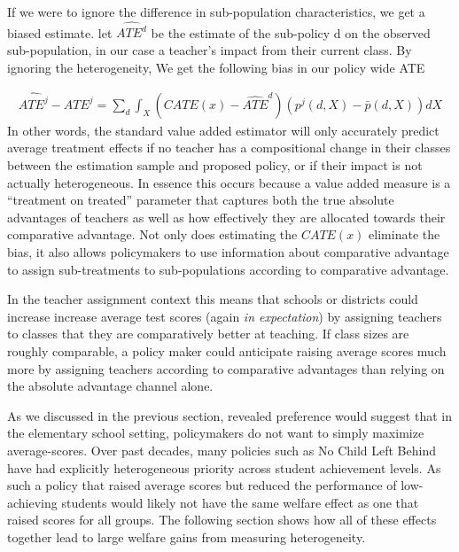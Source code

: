 \documentclass[12pt]{article}
\theoremstyle{definition}
\theoremstyle{definition}
\theoremstyle{definition}
\theoremstyle{definition}
\begin{document}
    If we were to ignore the difference in sub-population characteristics, we get a biased estimate. let $\hat{ATE^d}$ be the estimate of the sub-policy d on the observed sub-population, in our case a teacher's impact from their current class. By ignoring the heterogeneity, We get the following bias in our policy wide ATE
    
    \begin{equation}
    \begin{aligned}
    \hat{ATE^j}- ATE^j 
    =  \sum_d \int_X (CATE(x) -\hat{ATE}^d)(p^j(d,X)-\bar{p}(d,X)) dX
    \end{aligned}
    \end{equation} 
    \noindent In other words, the standard value added estimator will only accurately predict average treatment effects if no teacher has a compositional change in their classes between the estimation sample and proposed policy, or if their impact is not actually heterogeneous. In essence this occurs because a value added measure is a ``treatment on treated'' parameter that captures both the true absolute advantages of teachers as well as how effectively they are allocated towards their comparative advantage. Not only does estimating the $CATE(x)$ eliminate the bias, it also allows policymakers to use information about comparative advantage to assign sub-treatments to sub-populations according to comparative advantage. 

    In the teacher assignment context this means that schools or districts could increase increase average test scores (again \textit{in expectation}) by assigning teachers to classes that they are comparatively better at teaching. If class sizes are roughly comparable, a policy maker could anticipate raising average scores much more by assigning teachers according to comparative advantages than relying on the absolute advantage channel alone.
    
    As we discussed in the previous section, revealed preference would suggest that in the elementary school setting, policymakers do not want to simply maximize average-scores. Over past decades, many policies such as No Child Left Behind have had explicitly heterogeneous priority across student achievement levels. As such a policy that raised average scores but reduced the performance of low-achieving students would likely not have the same welfare effect as one that raised scores for all groups. The following section shows how all of these effects together lead to large welfare gains from measuring heterogeneity. 
\end{document}
